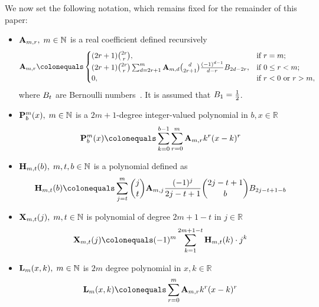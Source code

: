 We now set the following notation, which remains fixed for the remainder of this paper:
\begin{itemize}
    \item ${\mathbf{A}} \sb{m,r}, \; m\in\mathbb{N}$ is a real coefficient defined recursively
    \begin{equation}
        \label{eq:def_coeff_a}
        \coeffA{m}{r} \colonequals
        \begin{cases}
        (2r+1)
            \binom{2r}{r}, & \text{if } r=m; \\
            (2r+1) \binom{2r}{r} \sum_{d=2r+1}^{m} \coeffA{m}{d} \binom{d}{2r+1} \frac{(-1)^{d-1}}{d-r}
            \bernoulli{2d-2r}, & \text{if } 0 \leq r<m; \\
            0, & \text{if } r<0 \text{ or } r>m,
        \end{cases}
    \end{equation}
    where ${B}\sb{t}$ are Bernoulli numbers~\cite{WeissteinBernoulli}.
    It is assumed that ${B}\sb{1}=\frac{1}{2}$.

    \item ${\mathbf{P}}\sp{m} \sb{b}(x), \; m\in\mathbb{N}$ is a $2m+1$-degree integer-valued polynomial in $b,x\in\mathbb{R}$
    \begin{equation}
        \label{eq:def_polynomial_p}
        \polynomialP{m}{b}{x} \colonequals \sum_{k=0}^{b-1} \sum_{r=0}^{m} \coeffA{m}{r} k^r(x-k)^r
    \end{equation}

    \item ${\mathbf{H}} \sb{m,t} (b), \; m,t,b\in\mathbb{N}$ is a polynomial defined as
    \begin{equation}
        \label{eq:def_coeff_h}
        \coeffH{m}{t}{b}
        \colonequals
        \sum_{j=t}^{m} \binom{j}{t} \coeffA{m}{j} \frac{(-1)^j}{2j-t+1} \binom{2j-t+1}{b} \bernoulli{2j-t+1-b}
    \end{equation}

    \item ${\mathbf{X}}\sb{m,t} (j), \; m,t\in\mathbb{N}$ is polynomial of degree $2m+1-t$ in $j\in\mathbb{R}$
    \begin{equation}
        \label{eq:def_coeff_x}
        \polynomialX{m}{t}{j} \colonequals (-1)^m \sum_{k=1}^{2m+1-t} \coeffH{m}{t}{k} \cdot j^k
    \end{equation}

    \item ${\mathbf{L}}\sb{m}(x,k), \; m\in\mathbb{N}$ is $2m$ degree polynomial in $x,k\in\mathbb{R}$
    \begin{equation}
        \label{eq:def_polynomial_l}
        \polynomialL{m}{x}{k} \colonequals \sum_{r=0}^{m} \coeffA{m}{r} k^r(x-k)^r
    \end{equation}


\end{itemize}
